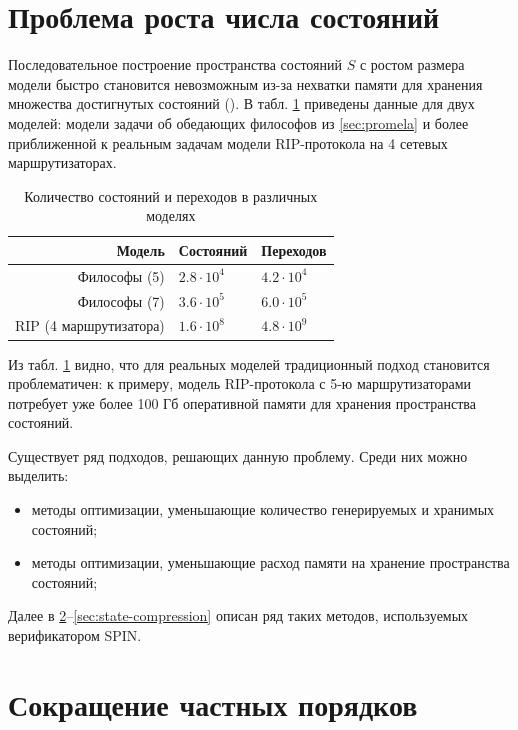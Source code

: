 \section{Проблема роста числа состояний}
\label{sec:state-explosion}

Последовательное построение пространства состояний $S$ с ростом размера модели
быстро становится невозможным из-за нехватки памяти для хранения множества
достигнутых состояний (). В табл. \ref{tab:models-statecount}
приведены данные для двух моделей: модели задачи об обедающих философов из
\ref{sec:promela} и более приближенной к реальным задачам модели RIP-протокола
на 4 сетевых маршрутизаторах.

\begin{table}
  \centering
  \begin{tabular}{|r|l|l|}
    \hline
    Модель                  & Состояний         & Переходов       \\
    \hline
    Философы (5)            & $2.8 \cdot 10^4$  & $4.2 \cdot 10^4$ \\
    Философы (7)            & $3.6 \cdot 10^5$  & $6.0 \cdot 10^5$ \\
    RIP (4 маршрутизатора)  & $1.6 \cdot 10^8$  & $4.8 \cdot 10^9$ \\
    \hline
  \end{tabular}
  \caption{Количество состояний и переходов в различных моделях}
\label{tab:models-statecount}
\end{table}

Из табл. \ref{tab:models-statecount} видно, что для реальных моделей традиционный подход
становится проблематичен: к примеру, модель RIP-протокола с 5-ю маршрутизаторами потребует
уже более 100 Гб оперативной памяти для хранения пространства состояний.

Существует ряд подходов, решающих данную проблему. Среди них можно выделить:

\begin{itemize}
\item методы оптимизации, уменьшающие количество генерируемых и хранимых состояний;
\item методы оптимизации, уменьшающие расход памяти на хранение пространства состояний;
\end{itemize}

Далее в \ref{sec:partial-order-reduction}--\ref{sec:state-compression} описан ряд таких методов,
используемых верификатором SPIN.

\section{Сокращение частных порядков}
\label{sec:partial-order-reduction}

